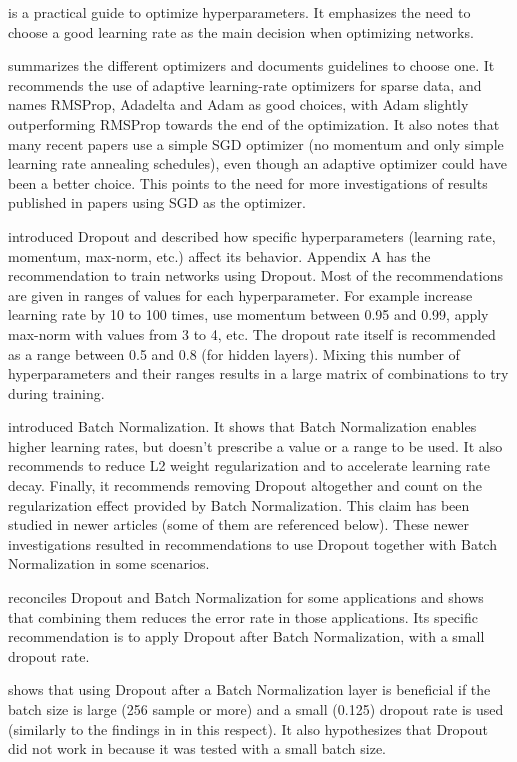 \documentclass[../CAP6619_term_project_cgarbin.tex]{subfiles}
\begin{document}
\cite{Bengio2012} is a practical guide to optimize hyperparameters. It emphasizes the need to choose a good learning rate as the main decision when optimizing networks.

\cite{Ruder2016} summarizes the different optimizers and documents guidelines to choose one. It recommends the use of adaptive learning-rate optimizers for sparse data, and names RMSProp, Adadelta and Adam as good choices, with Adam slightly outperforming RMSProp towards the end of the optimization. It also notes that many recent papers use a simple SGD optimizer (no momentum and only simple learning rate annealing schedules), even though an adaptive optimizer could have been a better choice. This points to the need for more investigations of results published in papers using SGD as the optimizer.

\cite{Srivastava2014} introduced Dropout and described how specific hyperparameters (learning rate, momentum, max-norm, etc.) affect its behavior. Appendix A has the recommendation to train networks using Dropout. Most of the recommendations are given in ranges of values for each hyperparameter. For example increase learning rate by 10 to 100 times, use momentum between 0.95 and 0.99, apply max-norm with values from 3 to 4, etc. The dropout rate itself is recommended as a range between 0.5 and 0.8 (for hidden layers). Mixing this number of hyperparameters and their ranges results in a large matrix of combinations to try during training.

\cite{Ioffe2015} introduced Batch Normalization. It shows that Batch Normalization enables higher learning rates, but doesn't prescribe a value or a range to be used. It also recommends to reduce L2 weight regularization and to accelerate learning rate decay. Finally, it recommends removing Dropout altogether and count on the regularization effect provided by Batch Normalization. This claim has been studied in newer articles (some of them are referenced below). These newer investigations resulted in recommendations to use Dropout together with Batch Normalization in some scenarios.

\cite{Li2018} reconciles Dropout and Batch Normalization for some applications and shows that combining them reduces the error rate in those applications. Its specific recommendation is to apply Dropout after Batch Normalization, with a small dropout rate. 

\cite{Luo2018} shows that using Dropout after a Batch Normalization layer is beneficial if the batch size is large (256 sample or more) and a small (0.125) dropout rate is used (similarly to the findings in \cite{Li2018} in this respect). It also hypothesizes that Dropout did not work in \cite{Ioffe2015} because it was tested with a small batch size.
\end{document}
